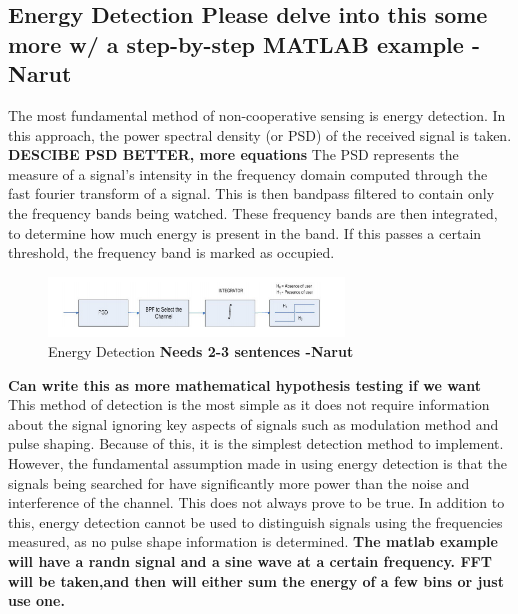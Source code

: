 \subsection{Energy Detection \textbf{Please delve into this some more w/ a step-by-step MATLAB example -Narut}}
The most fundamental method of non-cooperative sensing is energy detection. In this approach, the power spectral density (or PSD) of the received signal is taken\cite{sensing_energy}. \textbf{DESCIBE PSD BETTER, more equations} The PSD represents the measure of a signal’s intensity in the frequency domain computed through the fast fourier transform of a signal. This is then bandpass filtered to contain only the frequency bands being watched. These frequency bands are then integrated, to determine how much energy is present in the band. If this passes a certain threshold, the frequency band is marked as occupied.
\begin{figure}[ht]
\centering
\includegraphics[width=0.70\textwidth]{img/energy_detection.png}
\caption{Energy Detection \textbf{Needs 2-3 sentences -Narut}}
\label{fig:energy_detection}
\end{figure}\par
\textbf{Can write this as more mathematical hypothesis testing if we want}
This method of detection is the most simple as it does not require information about the signal ignoring key aspects of signals such as modulation method and pulse shaping. Because of this, it is the simplest detection method to implement. However, the fundamental assumption made in using energy detection is that the signals being searched for have significantly more power than the noise and interference of the channel. This does not always prove to be true. In addition to this, energy detection cannot be used to distinguish signals using the frequencies measured, as no pulse shape information is determined.
\textbf{The matlab example will have a randn signal and a sine wave at a certain frequency. FFT will be taken,and then will either sum the energy of a few bins or just use one.}

